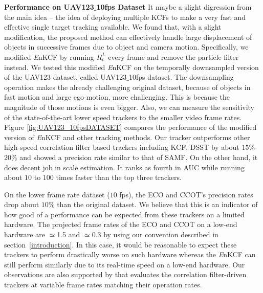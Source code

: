 \documentclass[10pt,twocolumn,letterpaper]{article}
\begin{document}
\textbf{Performance on UAV123$\_$10fps Dataset} It maybe a slight
digression from the main idea -- the idea of deploying multiple KCFs
to make a very fast and effective single target tracking available. We
found that, with a slight modification, the proposed method can
effectively handle large displacement of objects in successive frames
due to object and camera motion. Specifically, we modified {\it E}nKCF
by running $R_{t}^{L}$ every frame and remove the particle filter
instead. We tested this modified {\it E}nKCF on the temporally
downsampled version of the UAV123 dataset, called UAV123$\_$10fps
dataset. The downsampling operation makes the already challenging
original dataset, because of objects in fast motion and large
ego-motion, more challenging. This is because the magnitude of those
motions is even bigger. Also, we can measure the sensitivity of the
state-of-the-art lower speed trackers to the smaller video frame
rates.  Figure \ref{fig:UAV123_10fpsDATASET} compares the performance
of the modified version of {\it E}nKCF and other tracking methods. Our
tracker outperforms other high-speed correlation filter based trackers
including KCF, DSST by about $15\%$-$20\%$ and showed a precision rate
similar to that of SAMF. On the other hand, it does decent job in
scale estimation. It ranks as fourth in AUC while running about $10$
to $100$ times faster than the top three trackers.

On the lower frame rate dataset ($10$ fps), the ECO and CCOT's
precision rates drop about $10\%$ than the original dataset. We
believe that this is an indicator of how good of a performance can be
expected from these trackers on a limited hardware. The projected
frame rates of the ECO and CCOT on a low-end hardware are $\simeq$1.5
and $\simeq$0.3 by using our convention described in
section~\ref{introduction}. In this case, it would be reasonable to
expect these trackers to perform drastically worse on such hardware
whereas the {\it E}nKCF can still perform similarly due to its
real-time speed on a low-end hardware. Our observations are also
supported by \cite{mueller2017context} that evaluates the correlation
filter-driven trackers at variable frame rates matching their
operation rates.
\end{document}
